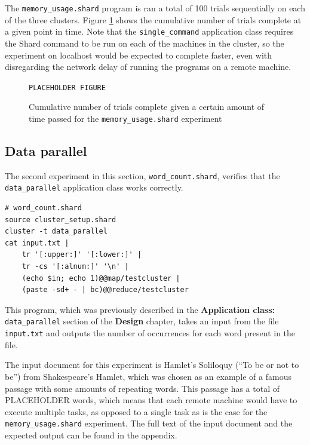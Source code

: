 \documentclass[twoside]{report}
\newcommand{\todoi}[1]{\todo[inline, color=blue!20]{TODO: {#1}}}
\begin{document}
The \texttt{memory\_usage.shard} program is ran a total of 100 trials sequentially on each of the three clusters.
Figure \ref{fig:memoryusage} shows the cumulative number of trials complete at a given point in time.
Note that the \texttt{single\_command} application class requires the Shard command to be run on each of the machines in the cluster, so the experiment on localhost would be expected to complete faster, even with disregarding the network delay of running the programs on a remote machine.

\begin{figure}[h]
  \begin{center}
    \vspace{2cm}
    \texttt{PLACEHOLDER FIGURE}
    \vspace{2cm}
    \caption{Cumulative number of trials complete given a certain amount of time passed for the \texttt{memory\_usage.shard} experiment}
    \label{fig:memoryusage}
  \end{center}
\end{figure}

\todoi{Some analysis on the actual results}

\subsection{Data parallel}
The second experiment in this section, \texttt{word\_count.shard}, verifies that the \texttt{data\_parallel} application class works correctly.
\begin{lstlisting}[language=Shard]
# word_count.shard
source cluster_setup.shard
cluster -t data_parallel
cat input.txt |
    tr '[:upper:]' '[:lower:]' |
    tr -cs '[:alnum:]' '\n' |
    (echo $in; echo 1)@@map/testcluster |
    (paste -sd+ - | bc)@@reduce/testcluster
\end{lstlisting}
This program, which was previously described in the \textbf{Application class: }\texttt{data\_parallel} section of the \textbf{Design} chapter, takes an input from the file \texttt{input.txt} and outputs the number of occurrences for each word present in the file.

The input document for this experiment is Hamlet's Soliloquy (``To be or not to be'') from Shakespeare's Hamlet, which was chosen as an example of a famous passage with some amounts of repeating words.
This passage has a total of PLACEHOLDER words, which means that each remote machine would have to execute multiple tasks, as opposed to a single task as is the case for the \texttt{memory\_usage.shard} experiment.
The full text of the input document and the expected output can be found in the appendix.
\end{document}
